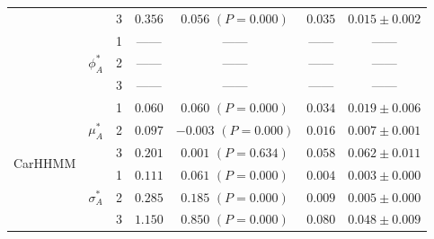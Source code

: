\documentclass{article}
\begin{document}
\begin{center}
{\begin{tabular}{ccccccc}
                            &                               & 3                                & $0.356$                         & $0.056$ $(P=0.000)$          & $0.035$                             & $0.015 \pm 0.002$                             \\
                            & \multirow{3}{*}{$\phi_A^*$}   & 1                                & ------                         & ------                     & ------                             & ------                                      \\
                            &                               & 2                                & ------                         & ------                     & ------                             & ------                                      \\
                            &                               & 3                                & ------                         & ------                     & ------                             & ------                                      \\ \hline
\multirow{9}{*}{CarHHMM}    & \multirow{3}{*}{$\mu_A^*$}    & 1                                & $0.060$                         & $0.060$ $(P=0.000)$          & $0.034$                             & $0.019 \pm 0.006$                             \\
                            &                               & 2                                & $0.097$                         & $-0.003$ $(P=0.000)$          & $0.016$                             & $0.007 \pm 0.001$                             \\
                            &                               & 3                                & $0.201$                         & $0.001$ $(P=0.634)$          & $0.058$                             & $0.062 \pm 0.011$                             \\
                            & \multirow{3}{*}{$\sigma_A^*$} & 1                                & $0.111$                         & $0.061$ $(P=0.000)$          & $0.004$                             & $0.003 \pm 0.000$                             \\
                            &                               & 2                                & $0.285$                         & $0.185$ $(P=0.000)$          & $0.009$                             & $0.005 \pm 0.000$                             \\ 
                            &                               & 3                                & $1.150$                         & $0.850$ $(P=0.000)$          & $0.080$                             & $0.048 \pm 0.009$                             \\

\end{tabular}}
\end{center}
\end{document}
